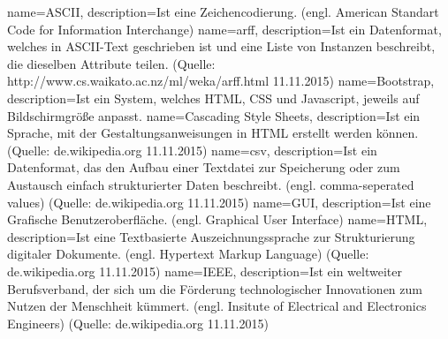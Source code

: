 {
	name=ASCII,
	description={Ist eine Zeichencodierung. (engl. American Standart Code for Information Interchange)}
}
{	
	name=arff,
	description={Ist ein Datenformat, welches in \gls{ASCII}-Text geschrieben ist und eine Liste von Instanzen beschreibt, die dieselben Attribute teilen. \newline(Quelle: http://www.cs.waikato.ac.nz/ml/weka/arff.html 11.11.2015)}
}
{
	name=Bootstrap,
	description={Ist ein System, welches \gls{HTML}, \gls{CSS} und \gls{Javascript}, jeweils auf Bildschirmgröße anpasst.}
}
{
name=Cascading Style Sheets,
description={Ist ein Sprache, mit der Gestaltungsanweisungen in \gls{HTML} erstellt werden können.
\newline (Quelle: de.wikipedia.org 11.11.2015)}
}
{
name=csv,
description={Ist ein Datenformat, das den Aufbau einer Textdatei zur Speicherung oder zum Austausch einfach strukturierter Daten beschreibt. (engl. comma-seperated values)
\newline (Quelle: de.wikipedia.org 11.11.2015)}
}
{
name=GUI,
description={Ist eine Grafische Benutzeroberfläche. (engl. Graphical User Interface)}
}
{
name=HTML,
description={Ist eine Textbasierte Auszeichnungssprache zur Strukturierung digitaler Dokumente. (engl. Hypertext Markup Language)
\newline (Quelle: de.wikipedia.org 11.11.2015)}
}
{
name=IEEE,
description={Ist ein weltweiter Berufsverband, der sich um die Förderung technologischer Innovationen zum Nutzen der Menschheit kümmert. (engl. Insitute of Electrical and Electronics Engineers)
\newline (Quelle: de.wikipedia.org 11.11.2015)}
}



